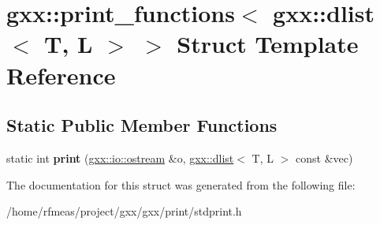 \hypertarget{structgxx_1_1print__functions_3_01gxx_1_1dlist_3_01T_00_01L_01_4_01_4}{}\section{gxx\+:\+:print\+\_\+functions$<$ gxx\+:\+:dlist$<$ T, L $>$ $>$ Struct Template Reference}
\label{structgxx_1_1print__functions_3_01gxx_1_1dlist_3_01T_00_01L_01_4_01_4}
\subsection*{Static Public Member Functions}
\begin{DoxyCompactItemize}
\item 
static int {\bfseries print} (\hyperlink{classgxx_1_1io_1_1ostream}{gxx\+::io\+::ostream} \&o, \hyperlink{classgxx_1_1dlist}{gxx\+::dlist}$<$ T, L $>$ const \&vec)\hypertarget{structgxx_1_1print__functions_3_01gxx_1_1dlist_3_01T_00_01L_01_4_01_4_a901ac5640114330a95879d1debf32f17}{}\label{structgxx_1_1print__functions_3_01gxx_1_1dlist_3_01T_00_01L_01_4_01_4_a901ac5640114330a95879d1debf32f17}

\end{DoxyCompactItemize}


The documentation for this struct was generated from the following file\+:\begin{DoxyCompactItemize}
\item 
/home/rfmeas/project/gxx/gxx/print/stdprint.\+h\end{DoxyCompactItemize}
